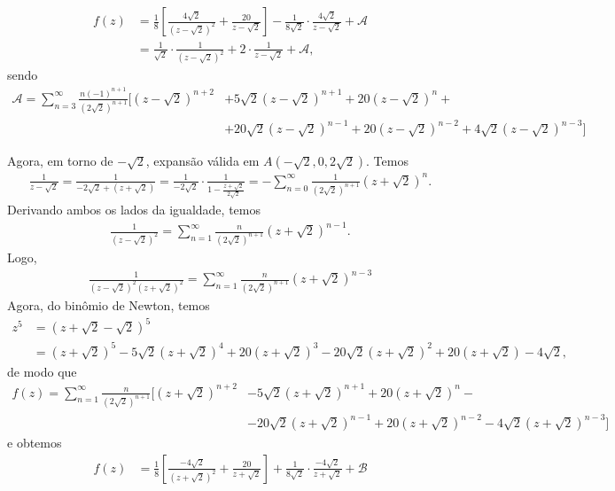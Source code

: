 \documentclass[12pt,a4paper]{article}
\begin{document}
\begin{enumerate}
\begin{enumerate}[(i)]
\begin{align*}
			f(z) &= \frac{1}{8}\left[ \frac{4\sqrt{2}}{(z-\sqrt{2})^2} + \frac{20}{z-\sqrt{2}} \right] - \frac{1}{8\sqrt{2}}\cdot\frac{4\sqrt{2}}{z-\sqrt{2}} + \mathcal{A} \\
			&= \frac{1}{\sqrt{2}}\cdot\frac{1}{(z-\sqrt{2})^2} + 2\cdot\frac{1}{z-\sqrt{2}} + \mathcal{A},
			\end{align*}
			sendo 
			\begin{align*}
			\mathcal{A} = \sum_{n=3}^{\infty}\frac{n(-1)^{n+1}}{(2\sqrt{2})^{n+1}} [(z-\sqrt{2})^{n+2} &+ 5\sqrt{2}(z-\sqrt{2})^{n+1} + 20(z-\sqrt{2})^n + \\ 
			&+ 20\sqrt{2}(z-\sqrt{2})^{n-1} + 20(z-\sqrt{2})^{n-2} + 4\sqrt{2}(z-\sqrt{2})^{n-3} ]
			\end{align*}			
			
			Agora, em torno de $-\sqrt{2}$, expansão válida em $A(-\sqrt{2},0,2\sqrt{2})$. Temos
			\begin{align*}
			\frac{1}{z-\sqrt{2}} = \frac{1}{-2\sqrt{2} + (z+\sqrt{2})} = \frac{1}{-2\sqrt{2}}\cdot\frac{1}{1 - \frac{z+\sqrt{2}}{2\sqrt{2}}} = -\sum_{n=0}^{\infty}\frac{1}{(2\sqrt{2})^{n+1}}(z+\sqrt{2})^n.
			\end{align*}
			Derivando ambos os lados da igualdade, temos
			\begin{align*}
			\frac{1}{(z-\sqrt{2})^2} = \sum_{n=1}^{\infty}\frac{n}{(2\sqrt{2})^{n+1}}(z+\sqrt{2})^{n-1}.
			\end{align*}
			Logo,
			\begin{align*}
			\frac{1}{(z-\sqrt{2})^2(z+\sqrt{2})^2} = \sum_{n=1}^{\infty}\frac{n}{(2\sqrt{2})^{n+1}}(z+\sqrt{2})^{n-3}
			\end{align*}
			Agora, do binômio de Newton, temos
			\begin{align*} 
			z^5 &= (z+\sqrt{2} - \sqrt{2})^5 \\ 
			&= (z+\sqrt{2})^5 - 5\sqrt{2}(z+\sqrt{2})^4 + 20(z+\sqrt{2})^3 - 20\sqrt{2}(z+\sqrt{2})^2 + 20(z+\sqrt{2}) - 4\sqrt{2},
			\end{align*}
			de modo que 
			\begin{align*}
			f(z) = \sum_{n=1}^{\infty}\frac{n}{(2\sqrt{2})^{n+1}} [(z+\sqrt{2})^{n+2} &- 5\sqrt{2}(z+\sqrt{2})^{n+1} + 20(z+\sqrt{2})^n - \\ 
			&- 20\sqrt{2}(z+\sqrt{2})^{n-1} + 20(z+\sqrt{2})^{n-2} - 4\sqrt{2}(z+\sqrt{2})^{n-3} ] 
			\end{align*} 
			e obtemos
			\begin{align*}
			f(z) &= \frac{1}{8}\left[ \frac{-4\sqrt{2}}{(z+\sqrt{2})^2} + \frac{20}{z+\sqrt{2}} \right] + \frac{1}{8\sqrt{2}}\cdot\frac{-4\sqrt{2}}{z+\sqrt{2}} + \mathcal{B} \\

\end{align*}
\end{enumerate}
\end{enumerate}
\end{document}
